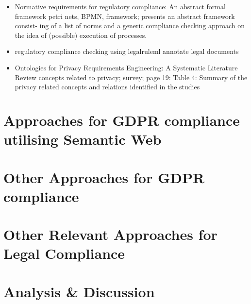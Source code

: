 \begin{itemize}
\item Normative requirements for regulatory compliance: An abstract formal framework \cite{hashmi_normative_2016} petri nets, BPMN, framework; presents an abstract framework consist- ing of a list of norms and a generic compliance checking approach on the idea of (possible) execution of processes.
\item regulatory compliance checking using legalruleml \cite{governatori_semantic_2016} annotate legal documents
\item Ontologies for Privacy Requirements Engineering: A Systematic Literature Review \cite{gharib_ontologies_2016} concepts related to privacy; survey; page 19: Table 4: Summary of the privacy related concepts and relations identified in the studies

\end{itemize}



\section{Approaches for GDPR compliance utilising Semantic Web}\label{sec:sota:gdpr-semweb}

\section{Other Approaches for GDPR compliance}\label{sec:sota:gdpr-other}

\section{Other Relevant Approaches for Legal Compliance}\label{sec:sota:other}

\section{Analysis \& Discussion}\label{sec:sota:analysis}